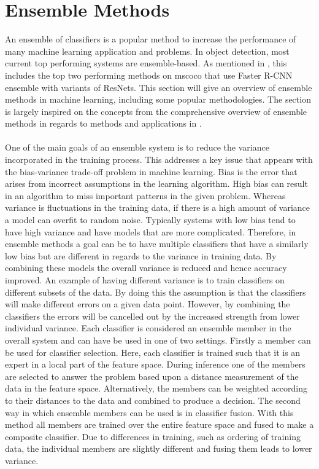 \section{Ensemble Methods}
An ensemble of classifiers is a popular method to increase the performance of many machine learning application and problems. In object detection, most current top performing systems are ensemble-based. As mentioned in , this includes the top two performing methods on \gls{mscoco} that use Faster R-CNN ensemble with variants of ResNets.
This section will give an overview of ensemble methods in machine learning, including some popular methodologies. The section is largely inspired on the concepts from the comprehensive overview of ensemble methods in regards to methods and applications in \cite{ensemblebook}.
\\\\
One of the main goals of an ensemble system is to reduce the variance incorporated in the training process. This addresses a key issue that appears with the bias-variance trade-off problem in machine learning. Bias is the error that arises from incorrect assumptions in the learning algorithm. High bias can result in an algorithm to miss important patterns in the given problem. Whereas variance is fluctuations in the training data, if there is a high amount of variance a model can overfit to random noise. Typically systems with low bias tend to have high variance and have models that are more complicated. Therefore, in ensemble methods a goal can be to have multiple classifiers that have a similarly low bias but are different in regards to the variance in training data. By combining these models the overall variance is reduced and hence accuracy improved. An example of having different variance is to train classifiers on different subsets of the data. By doing this the assumption is that the classifiers will make different errors on a given data point. However, by combining the classifiers the errors will be cancelled out by the increased strength from lower individual variance. Each classifier is considered an ensemble member in the overall system and can have be used in one of two settings. Firstly a member can be used for classifier selection. Here, each classifier is trained such that it is an expert in a local part of the feature space. During inference one of the members are selected to answer the problem based upon a distance measurement of the data in the feature space. Alternatively, the members can be weighted according to their distances to the data and combined to produce a decision. The second way in which ensemble members can be used is in classifier fusion. With this method all members are trained over the entire feature space and fused to make a composite classifier. Due to differences in training, such as ordering of training data, the individual members are slightly different and fusing them leads to lower variance.

